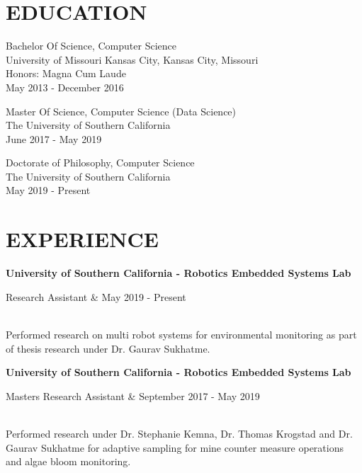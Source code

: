 \documentclass[margin,10pt]{res} %
\begin{document}

\address{ 1026 W 22nd St. \\ Los Angeles, California 90007  \\
(913) 908-6148 \\ cdennist@usc.edu}

\begin{resume}
\section{EDUCATION}      
Bachelor Of Science, Computer Science  \\
               University of Missouri Kansas City, Kansas City, Missouri \\
               Honors: Magna Cum Laude\\
               May 2013 - December 2016

Master Of Science, Computer Science (Data Science) \\
   The University of Southern California \\
   June 2017 - May 2019
    
Doctorate of Philosophy, Computer Science \\
   The University of Southern California \\
   May 2019 - Present
\section{EXPERIENCE}
 		{\bf University of Southern California - Robotics Embedded Systems Lab} \\
		\begin{ncolumn}{2}
			Research Assistant & May 2019 - Present
		\end{ncolumn} \\           
		Performed research on multi robot systems for environmental monitoring as part of thesis research under Dr. Gaurav Sukhatme.
		
	      {\bf University of Southern California - Robotics Embedded Systems Lab} \\
           \begin{ncolumn}{2}
           Masters Research Assistant & September 2017 - May 2019
           \end{ncolumn} \\           
           Performed research under Dr. Stephanie Kemna, Dr. Thomas Krogstad and Dr. Gaurav Sukhatme for adaptive sampling for mine counter measure operations and algae bloom monitoring.
       

\end{resume}
\end{document}
